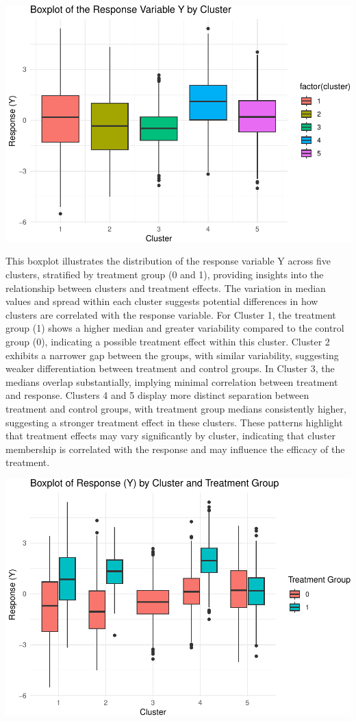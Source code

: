 \documentclass[
]{article}
\begin{document}
\begin{center}\includegraphics{Project3Simulation_files/figure-latex/unnamed-chunk-6-1} \end{center}

This boxplot illustrates the distribution of the response variable Y
across five clusters, stratified by treatment group (0 and 1), providing
insights into the relationship between clusters and treatment effects.
The variation in median values and spread within each cluster suggests
potential differences in how clusters are correlated with the response
variable. For Cluster 1, the treatment group (1) shows a higher median
and greater variability compared to the control group (0), indicating a
possible treatment effect within this cluster. Cluster 2 exhibits a
narrower gap between the groups, with similar variability, suggesting
weaker differentiation between treatment and control groups. In Cluster
3, the medians overlap substantially, implying minimal correlation
between treatment and response. Clusters 4 and 5 display more distinct
separation between treatment and control groups, with treatment group
medians consistently higher, suggesting a stronger treatment effect in
these clusters. These patterns highlight that treatment effects may vary
significantly by cluster, indicating that cluster membership is
correlated with the response and may influence the efficacy of the
treatment.

\begin{center}\includegraphics{Project3Simulation_files/figure-latex/unnamed-chunk-7-1} \end{center}
\end{document}
